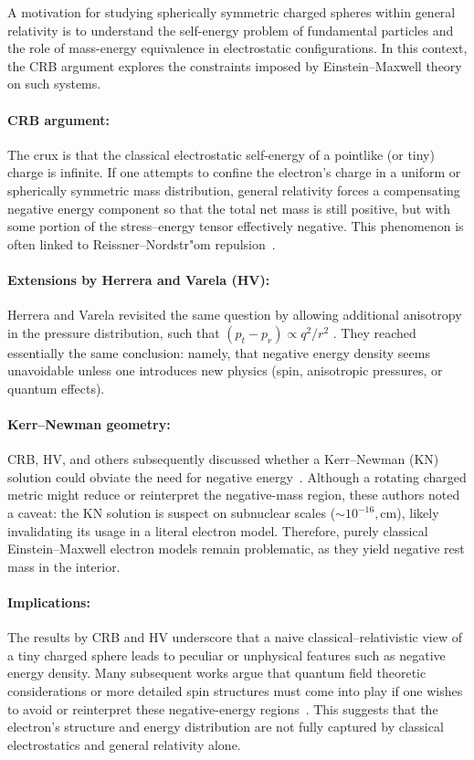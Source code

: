 A motivation for studying spherically symmetric charged spheres within general relativity is to understand the self-energy problem of fundamental particles and the role of mass-energy equivalence in electrostatic configurations. In this context, the CRB argument explores the constraints imposed by Einstein--Maxwell theory on such systems.

\paragraph{CRB argument:} The crux is that the classical electrostatic self-energy of a pointlike (or tiny) charge is infinite. If one attempts to confine the electron's charge in a uniform or spherically symmetric mass distribution, general relativity forces a compensating negative energy component so that the total net mass is still positive, but with some portion of the stress--energy tensor effectively negative. This phenomenon is often linked to Reissner--Nordstr"om repulsion~\cite{Bonnor1965}.

\paragraph{Extensions by Herrera and Varela (HV):} Herrera and Varela revisited the same question by allowing additional anisotropy in the pressure distribution, such that $(p_t - p_r)\propto q^2/r^2$ \cite{HerreraVarela1994}. They reached essentially the same conclusion: namely, that negative energy density seems unavoidable unless one introduces new physics (spin, anisotropic pressures, or quantum effects).

\paragraph{Kerr--Newman geometry:} CRB, HV, and others subsequently discussed whether a Kerr--Newman (KN) solution could obviate the need for negative energy~\cite{Herrera1982,MannMorris1993}. Although a rotating charged metric might reduce or reinterpret the negative-mass region, these authors noted a caveat: the KN solution is suspect on subnuclear scales ($\sim10^{-16},\mathrm{cm}$), likely invalidating its usage in a literal electron model. Therefore, purely classical Einstein--Maxwell electron models remain problematic, as they yield negative rest mass in the interior.

\paragraph{Implications:} The results by CRB and HV underscore that a naive classical--relativistic view of a tiny charged sphere leads to peculiar or unphysical features such as negative energy density. Many subsequent works argue that quantum field theoretic considerations or more detailed spin structures must come into play if one wishes to avoid or reinterpret these negative-energy regions~\cite{CRB1970,HerreraVarela1994}. This suggests that the electron's structure and energy distribution are not fully captured by classical electrostatics and general relativity alone.




